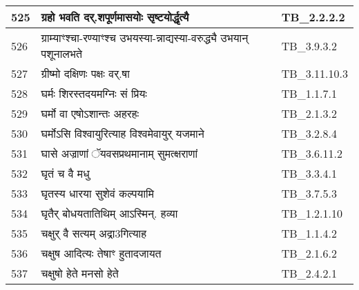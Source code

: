\documentclass[17pt]{extarticle}
\begin{document}
\begin{longtable}{||p{0.4in}||p{4.9in}||p{0.9in}||}
    525 & ग्रहो भवति दर्.शपूर्णमासयोः सृष्टयोर्द्धृत्यै & TB\_2.2.2.2       \\
    
    \hline
        
    526 & ग्राम्याꣳश्चा{-}रण्याꣳश्च उभयस्या{-}न्नाद्यस्या{-}वरुद्ध्यै उभयान् पशूनालभते & TB\_3.9.3.2       \\
    
    \hline
        
    527 & ग्रीष्मो दक्षिणः पक्षः वर्.षा & TB\_3.11.10.3       \\
    
    \hline
        
    528 & घर्मः शिरस्तदयमग्निः सं प्रियः & TB\_1.1.7.1       \\
    
    \hline
        
    529 & घर्मो वा एषोऽशान्तः अहरहः & TB\_2.1.3.2       \\
    
    \hline
        
    530 & घर्मोऽसि विश्वायुरित्याह विश्वमेवायुर् यजमाने & TB\_3.2.8.4       \\
    
    \hline
        
    531 & घासे अज्राणां ॅयवसप्रथमानाम् सुमत्क्षराणां & TB\_3.6.11.2       \\
    
    \hline
        
    532 & घृतं च वै मधु & TB\_3.3.4.1       \\
    
    \hline
        
    533 & घृतस्य धारया सुशेवं कल्पयामि & TB\_3.7.5.3       \\
    
    \hline
        
    534 & घृतैर् बोधयतातिथिम् आऽस्मिन्. हव्या & TB\_1.2.1.10       \\
    
    \hline
        
    535 & चक्षुर् वै सत्यम् अद्रा3गित्याह & TB\_1.1.4.2       \\
    
    \hline
        
    536 & चक्षुष आदित्यः तेषाꣳ हुतादजायत & TB\_2.1.6.2       \\
    
    \hline
        
    537 & चक्षुषो हेते मनसो हेते & TB\_2.4.2.1       \\
    

\end{longtable}
\end{document}
